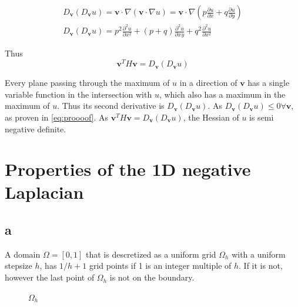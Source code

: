 \documentclass{article}
\begin{document}
\begin{align*}
D_{\mathbf{v}}\left(D_{\mathbf{v}} u\right)=\mathbf{v}\cdot \nabla(\mathbf{v} \cdot \nabla u)=\mathbf{v}\cdot \nabla(p\frac{\partial u}{\partial x}+q\frac{\partial u}{\partial y})\\
D_{\mathbf{v}}\left(D_{\mathbf{v}} u\right)=p^2\frac{\partial^2 u}{\partial x^2}+(p+q)\frac{\partial^2 u}{\partial xy} +q^2\frac{\partial^2 u}{\partial x^2}
\end{align*}

Thus 
\begin{equation}
\mathbf{v}^{T} H \mathbf{v}=D_{\mathbf{v}}\left(D_{\mathbf{v}} u\right)
\end{equation}


Every plane passing through the maximum of $u$ in a direction of $\mathbf{v}$ has a single variable function in the intersection with $u$, which also has a maximum in the maximum of $u$. Thus its second derivative is $D_{\mathbf{v}}\left(D_{\mathbf{v}} u\right)$.
As $D_{\mathbf{v}}\left(D_{\mathbf{v}} u\right) \leq 0   \forall \mathbf{v}$, as proven in \autoref{eq:proooof}. As $\mathbf{v}^{T} H \mathbf{v}=D_{\mathbf{v}}\left(D_{\mathbf{v}} u\right)$, the Hessian of $u$ is semi negative definite.


\newpage
\section{Properties of the 1D negative Laplacian}
\subsection{a}
A domain $\Omega=\left[0,1\right]$ that is descretized as a uniform grid $\Omega_h$ with a uniform stepsize $h$, has $1/h+1$ grid points if 1 is an integer multiple of $h$. If it is not, however the last point of $\Omega_h$ is not on the boundary.
\begin{figure}[H]
\centering
{}
\caption{$\Omega_h$}
\end{figure}
\end{document}
